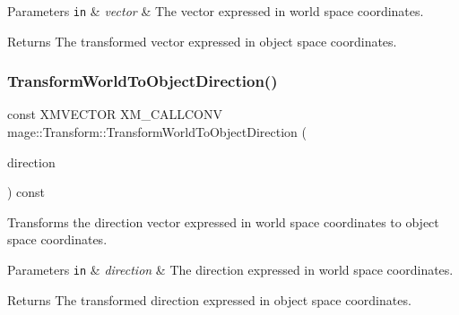 \begin{DoxyParams}[1]{Parameters}
\mbox{\tt in}  & {\em vector} & The vector expressed in world space coordinates. \\
\hline
\end{DoxyParams}
\begin{DoxyReturn}{Returns}
The transformed vector expressed in object space coordinates. 
\end{DoxyReturn}
\mbox{\label{classmage_1_1_transform_a5f7294e796fa370e44c6ca055638ffde}} 
\subsubsection{\texorpdfstring{Transform\+World\+To\+Object\+Direction()}{TransformWorldToObjectDirection()}}
{\footnotesize\ttfamily const X\+M\+V\+E\+C\+T\+OR X\+M\+\_\+\+C\+A\+L\+L\+C\+O\+NV mage\+::\+Transform\+::\+Transform\+World\+To\+Object\+Direction (\begin{DoxyParamCaption}\item[{F\+X\+M\+V\+E\+C\+T\+OR}]{direction }\end{DoxyParamCaption}) const\hspace{0.3cm}{\ttfamily [noexcept]}}

Transforms the direction vector expressed in world space coordinates to object space coordinates.


\begin{DoxyParams}[1]{Parameters}
\mbox{\tt in}  & {\em direction} & The direction expressed in world space coordinates. \\
\hline
\end{DoxyParams}
\begin{DoxyReturn}{Returns}
The transformed direction expressed in object space coordinates. 
\end{DoxyReturn}
\mbox{\label{classmage_1_1_transform_af4d6c69cbf207632ded7c33446c5ee91}} 
